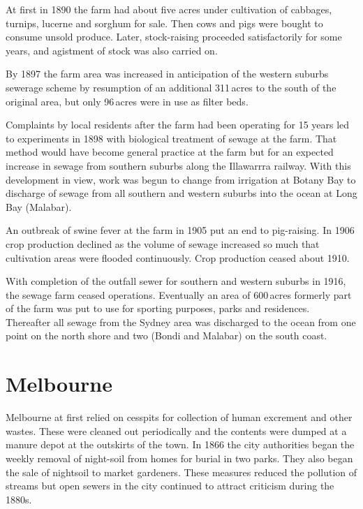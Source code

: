 At first in 1890 the farm had about five acres under cultivation of
cabbages, tur\-nips, lucerne and sorghum for sale.  Then cows and pigs
were bought to consume unsold produce.  Later, stock-raising proceeded
satisfactorily for some years, and agistment of stock was also carried
on.

By 1897 the farm area was increased in anticipation of the western
suburbs sewerage scheme by resumption of an additional 311\,acres to
the south of the original area, but only 96\,acres were in use as
filter beds.

Complaints by local residents after the farm had been operating for 15
years led to experiments in 1898 with biological treatment of sewage
at the farm.  That method would have become general practice at the
farm but for an expected increase in sewage from southern suburbs
along the Illawarrra railway.  With this development
in view, work was begun to change from irrigation at Botany Bay to
discharge of sewage from all southern and western suburbs into the
ocean at Long Bay  (Malabar).

An outbreak of swine fever at the farm in 1905 put an end to
pig-raising.  In 1906 crop production declined as the volume of sewage
increased so much that cultivation areas were flooded
continuously.  Crop production ceased about 1910.

With completion of the outfall sewer for southern and western suburbs
in 1916, the sewage farm ceased operations.  Eventually an area of
600\,acres formerly part of the farm was put to use for sporting
purposes, parks and residences.  Thereafter all sewage from the Sydney
area was discharged to the ocean from one point on the north shore and
two (Bondi and Malabar)  on the south
coast.

\section*{Melbourne}

Melbourne at first relied on cesspits for collection of human
excrement and other wastes.  These were cleaned out periodically and
the contents were dumped at a manure depot at the outskirts of the
town.  In 1866 the city authorities began the weekly removal of
night-soil from homes for burial in two parks.  They also began the
sale of nightsoil to market gardeners.  These
measures reduced the pollution of streams but open sewers in the city
continued to attract criticism during the
1880s.

